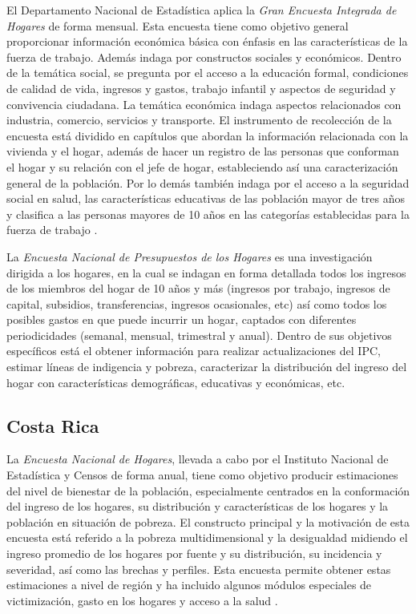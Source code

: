 \documentclass[12pt,spanish,]{book}
\begin{document}
El Departamento Nacional de Estadística aplica la \emph{Gran Encuesta Integrada de Hogares} de forma mensual. Esta encuesta tiene como objetivo general proporcionar información económica básica con énfasis en las características de la fuerza de trabajo. Además indaga por constructos sociales y económicos. Dentro de la temática social, se pregunta por el acceso a la educación formal, condiciones de calidad de vida, ingresos y gastos, trabajo infantil y aspectos de seguridad y convivencia ciudadana. La temática económica indaga aspectos relacionados con industria, comercio, servicios y transporte. El instrumento de recolección de la encuesta está dividido en capítulos que abordan la información relacionada con la vivienda y el hogar, además de hacer un registro de las personas que conforman el hogar y su relación con el jefe de hogar, estableciendo así una caracterización general de la población. Por lo demás también indaga por el acceso a la seguridad social en salud, las características educativas de las población mayor de tres años y clasifica a las personas mayores de 10 años en las categorías establecidas para la fuerza de trabajo \autocite{DANE-COL_2017}.

La \emph{Encuesta Nacional de Presupuestos de los Hogares} es una investigación dirigida a los hogares, en la cual se indagan en forma detallada todos los ingresos de los miembros del hogar de 10 años y más (ingresos por trabajo, ingresos de capital, subsidios, transferencias, ingresos ocasionales, etc) así como todos los posibles gastos en que puede incurrir un hogar, captados con diferentes periodicidades (semanal, mensual, trimestral y anual). Dentro de sus objetivos específicos está el obtener información para realizar actualizaciones del IPC, estimar líneas de indigencia y pobreza, caracterizar la distribución del ingreso del hogar con características demográficas, educativas y económicas, etc. \autocite{DANE-COL_2018}

\hypertarget{costa-rica}{%
\subsection*{Costa Rica}\label{costa-rica}}

La \emph{Encuesta Nacional de Hogares}, llevada a cabo por el Instituto Nacional de Estadística y Censos de forma anual, tiene como objetivo producir estimaciones del nivel de bienestar de la población, especialmente centrados en la conformación del ingreso de los hogares, su distribución y características de los hogares y la población en situación de pobreza. El constructo principal y la motivación de esta encuesta está referido a la pobreza multidimensional y la desigualdad midiendo el ingreso promedio de los hogares por fuente y su distribución, su incidencia y severidad, así como las brechas y perfiles. Esta encuesta permite obtener estas estimaciones a nivel de región y ha incluido algunos módulos especiales de victimización, gasto en los hogares y acceso a la salud \autocite{INEC-CR_2017}.
\end{document}
